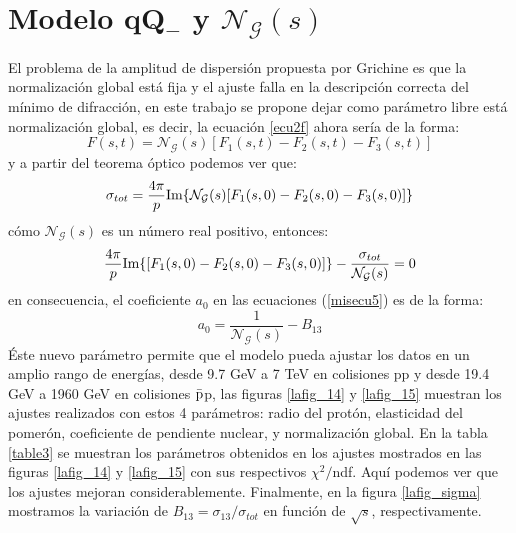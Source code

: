 \section{Modelo qQ$_{-}$ y $\mathcal{N_{G}}(s)$}
El problema de la amplitud de dispersión propuesta por Grichine es que la normalización global est\'a fija y el ajuste falla en la descripción correcta del mínimo de difracción, en este trabajo se propone dejar como parámetro libre est\'a normalización global, es decir, la ecuación \ref{ecu2f} ahora ser\'ia de la forma:
\begin{equation}
F(s,t)=\mathcal{N_G}(s)[F_1(s,t)-F_2(s,t)-F_3(s,t)]
\end{equation}
y a partir del teorema óptico podemos ver que:
\begin{equation}
\sigma_{tot}=\frac{4\pi}{p}\textup{Im}\{\mathcal{N_G}(s)[F_1(s,0)-F_2(s,0)-F_3(s,0)]\}
\end{equation}
c\'omo $\mathcal{N_G}(s)$ es un n\'umero real positivo, entonces: 
\begin{equation}
\frac{4\pi}{p}\textup{Im}\{[F_1(s,0)-F_2(s,0)-F_3(s,0)]\}-\frac{\sigma_{tot}}{\mathcal{N_G}(s)}=0
\end{equation}
en consecuencia, el coeficiente $a_0$ en las ecuaciones (\ref{misecu5}) es de la forma:
\begin{equation}
a_0=\frac{1}{\mathcal{N_G}(s)}-B_{13}
\end{equation}
\'Este nuevo parámetro permite que el modelo pueda ajustar los datos en un amplio rango de energías, desde 9.7 GeV a 7 TeV en colisiones pp y desde 19.4 GeV a 1960 GeV en colisiones $\bar{\textup{p}}$p, las figuras \ref{lafig_14} y \ref{lafig_15} muestran los ajustes realizados con estos 4 parámetros: radio del prot\'on, elasticidad del pomer\'on, coeficiente de pendiente nuclear, y normalización global. En la tabla \ref{table3} se muestran los parámetros obtenidos en los ajustes mostrados en las figuras \ref{lafig_14} y \ref{lafig_15} con sus respectivos $\chi^2/$ndf. Aquí podemos ver que los ajustes mejoran considerablemente.
Finalmente, en la  figura \ref{lafig_sigma}  mostramos la variación de $B_{13}=\sigma_{13}/\sigma_{tot}$  en funci\'on de $\sqrt{s}$, respectivamente. 
